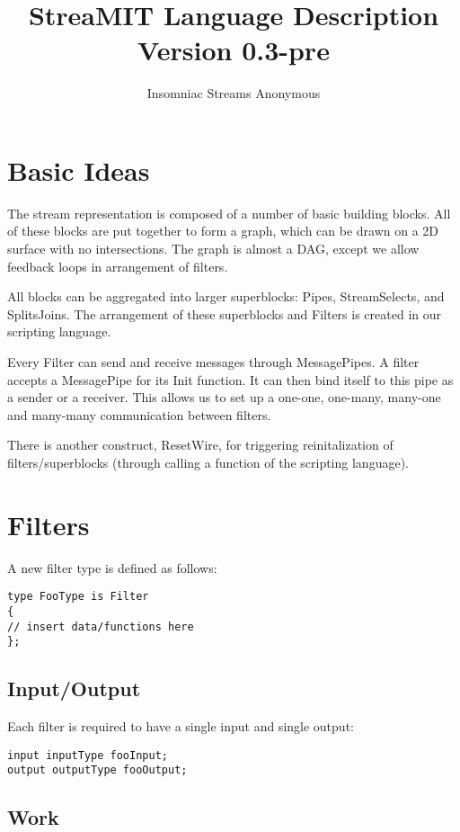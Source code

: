 \documentclass[twocolumn, draft]{article}
\title{StreaMIT Language Description \\ Version 0.3-pre}
\author{Insomniac Streams Anonymous}
\begin{document}
\maketitle

\section{Basic Ideas}

The stream representation is composed of a number of basic building blocks.
All of these blocks are put together to form a graph, which can be drawn
on a 2D surface with no intersections.  The graph is almost a DAG, except
we allow feedback loops in arrangement of filters.

All blocks can be aggregated into larger superblocks:  Pipes, StreamSelects,
and SplitsJoins.  The arrangement of these superblocks and
Filters is created in our scripting language.

Every Filter can send and receive messages through MessagePipes.  A filter 
accepts a MessagePipe for its Init function.  It can then bind itself
to this pipe as a sender or a receiver.  This allows us to set up a one-one,
one-many, many-one and many-many communication between filters.

There is another construct, ResetWire, for triggering reinitalization of 
filters/superblocks (through calling a function of the scripting language).

\section{Filters}
A new filter type is defined as follows:

\begin{verbatim}
type FooType is Filter
{
// insert data/functions here
};
\end{verbatim}

\subsection{Input/Output}

Each filter is required to have a single input and single output:
\begin{verbatim}
input inputType fooInput;
output outputType fooOutput;
\end{verbatim}

\subsection{Work}
\end{document}
